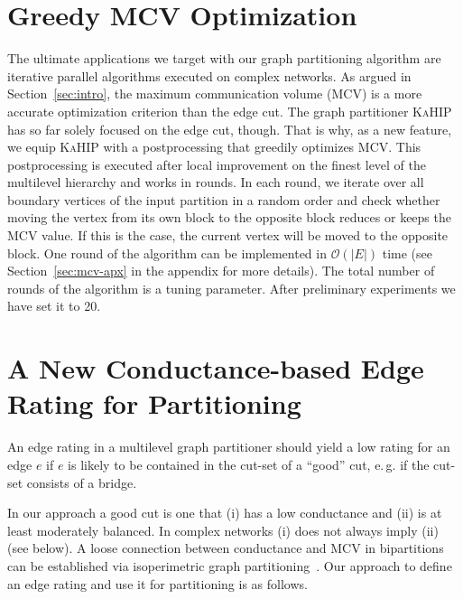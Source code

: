 \documentclass[pdftex]{llncs}
\newcommand{\eg}{e.\,g.\xspace}
\newcommand{\kahip}{\textsc{KaHIP}\xspace}
\numberwithin{equation}{section}
\numberwithin{example}{section}
\numberwithin{table}{section}
\begin{document}
\section{Greedy MCV Optimization}
\label{sec:GP}
The ultimate applications we target with our graph partitioning algorithm are iterative parallel algorithms executed on complex
networks. As argued in Section~\ref{sec:intro}, the maximum communication volume (MCV)
is a more accurate optimization criterion than the edge cut.
The graph partitioner \kahip has so far solely focused on the edge
cut, though. That is why, as a new feature, we equip \kahip with a
postprocessing that greedily optimizes MCV. This postprocessing is
executed after local improvement on the finest level of the multilevel
hierarchy and works in rounds.
In each round, we iterate over all boundary vertices of the input
partition in a random order and check whether moving the vertex from its
own block to the opposite block reduces or keeps the MCV value.
If this is the case, the current vertex will be moved to the
opposite block.  One round of the algorithm can be implemented in
$\mathcal{O}({\vert E \vert})$ time (see Section~\ref{sec:mcv-apx} in the appendix
for more details).  The total number of rounds of the algorithm is a tuning parameter.  After
preliminary experiments we have set it to 20.


\section{A New Conductance-based Edge Rating for Partitioning}
\label{sec:BI}
An edge rating in a multilevel graph partitioner should yield a low
rating for an edge $e$ if $e$ is likely to be contained in the cut-set
of a ``good'' cut, \eg if the cut-set consists of a bridge.

In our approach a good cut is one that (i) has a low conductance and
(ii) is at least moderately balanced. In complex networks (i) does not
always imply (ii) (see below).  A loose connection between conductance
and MCV in bipartitions can be established via isoperimetric graph
partitioning~\cite{GradyS06isoperimetric}.  Our approach to define an
edge rating and use it for partitioning is as follows.
\end{document}
